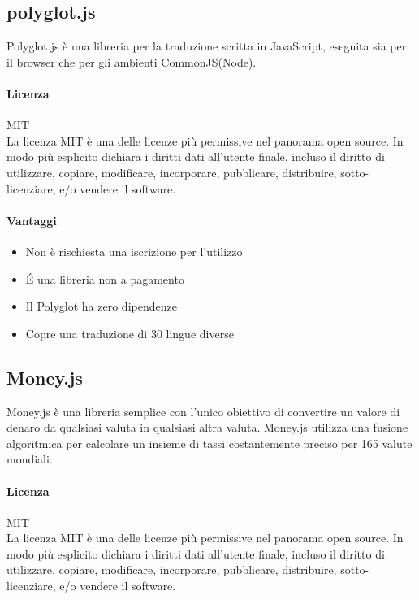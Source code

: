 \subsection{polyglot.js}
Polyglot.js è una libreria per la traduzione scritta in JavaScript, eseguita sia per il browser che per gli ambienti CommonJS(Node).

\paragraph{Licenza} MIT \\
La licenza MIT è una delle licenze più permissive nel panorama open
source. In modo più esplicito dichiara i diritti dati all'utente
finale, incluso il diritto di utilizzare, copiare, modificare,
incorporare, pubblicare, distribuire, sotto-licenziare, e/o vendere il
software. \\

\paragraph{Vantaggi}
\begin{itemize}
	\item Non è rischiesta una iscrizione per l'utilizzo
	\item \'E una libreria non a pagamento
	\item Il Polyglot ha zero dipendenze
	\item Copre una traduzione di 30 lingue diverse
\end{itemize}




\subsection{Money.js}

Money.js è una libreria semplice con l'unico obiettivo di convertire
un valore di denaro da qualsiasi valuta in qualsiasi altra
valuta. Money.js utilizza una fusione algoritmica per calcolare un
insieme di tassi costantemente preciso per 165 valute mondiali. 
 \\

\paragraph{Licenza} MIT \\
La licenza MIT è una delle licenze più permissive nel panorama open
source. In modo più esplicito dichiara i diritti dati all'utente
finale, incluso il diritto di utilizzare, copiare, modificare,
incorporare, pubblicare, distribuire, sotto-licenziare, e/o vendere il
software.\\ 

